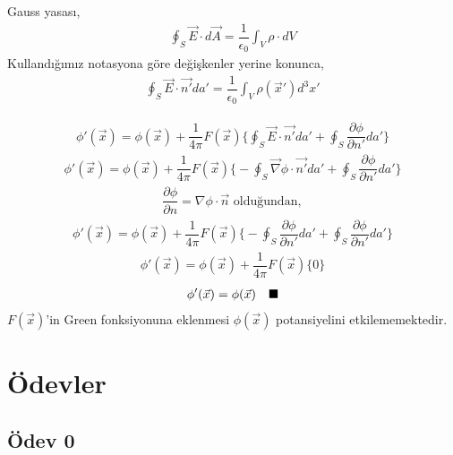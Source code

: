\begin{tcolorbox}
Gauss yasası,
\begin{align*}
\oint_{S} \Vec{E} \cdot d \Vec{A} = \dfrac{1}{\epsilon_{0}} \int_{V} \rho \cdot dV
\end{align*}
Kullandığımız notasyona göre değişkenler yerine konunca,
\begin{align*}
\oint_{S} \Vec{E} \cdot \Vec{n'} da' = \dfrac{1}{\epsilon_{0}} \int_{V} \rho (\vec{x}') d^{3} x'
\end{align*}
\end{tcolorbox}
\begin{align*}
\phi' ( \Vec{x})  = \phi (\Vec{x}) + \dfrac{1}{4 \pi} F(\Vec{x}) \bigg\{ \oint_{S} \Vec{E} \cdot \Vec{n'} da'   + \oint_{S} \dfrac{\partial \phi}{\partial n'}  da' \bigg\}  
\end{align*} 
\begin{align*}
\phi' ( \Vec{x})  = \phi (\Vec{x}) + \dfrac{1}{4 \pi} F(\Vec{x}) \bigg\{ - \oint_{S} \Vec{\nabla} \phi \cdot \Vec{n'} da'   + \oint_{S} \dfrac{\partial \phi}{\partial n'}  da' \bigg\} 
\end{align*}
\begin{align*}
\dfrac{\partial \phi}{\partial n} = \nabla \phi \cdot \Vec{n} \textrm{  olduğundan},
\end{align*}
\begin{align*}
\phi' ( \Vec{x})  = \phi (\Vec{x}) + \dfrac{1}{4 \pi} F(\Vec{x}) \bigg\{ - \oint_{S} \dfrac{\partial \phi}{\partial n'} da'   + \oint_{S} \dfrac{\partial \phi}{\partial n'}  da' \bigg\}  
\end{align*}
\begin{align*}
\phi' ( \Vec{x})  = \phi (\Vec{x}) + \dfrac{1}{4 \pi} F(\Vec{x}) \bigg\{ 0 \bigg\}  
\end{align*}
\begin{align*}
\phi' ( \Vec{x})  = \phi (\Vec{x}) \qed
\end{align*}
$F(\Vec{x})$'in Green fonksiyonuna eklenmesi $\phi (\Vec{x})$ potansiyelini etkilememektedir.  

\newpage

\section{Ödevler}
\subsection*{Ödev 0}

